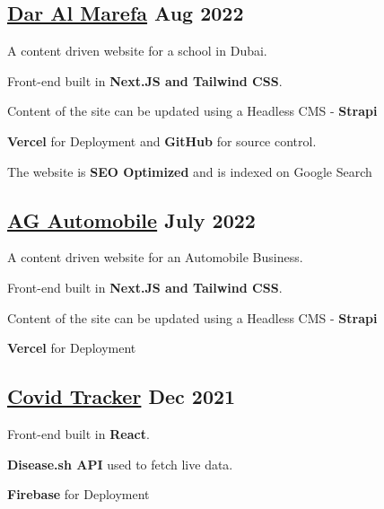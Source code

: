 \subsection{{\href{https://www.daralmarefa.ae/}{Dar Al Marefa} \hfill Aug 2022}}
\begin{zitemize}
\item A content driven website for a school in Dubai.
\item Front-end built in \textbf{Next.JS and Tailwind CSS}.
\item Content of the site can be updated using a Headless CMS - \textbf{Strapi}
\item \textbf{Vercel} for Deployment and \textbf{GitHub} for source control.
\item The website is \textbf{SEO Optimized} and is indexed on Google Search
\end{zitemize}

\subsection{{\href{https://www.agautomobile.com/}{AG Automobile} \hfill July 2022}}
\begin{zitemize}
\item A content driven website for an Automobile Business.
\item Front-end built in \textbf{Next.JS and Tailwind CSS}.
\item Content of the site can be updated using a Headless CMS - \textbf{Strapi}
\item \textbf{Vercel} for Deployment
\end{zitemize}

\subsection{{\href{https://alias-covid-tracker.web.app/}{Covid Tracker} \hfill Dec 2021}}
\begin{zitemize}
\item Front-end built in \textbf{React}.
\item \textbf{Disease.sh API} used to fetch live data.
\item \textbf{Firebase} for Deployment
\end{zitemize}


